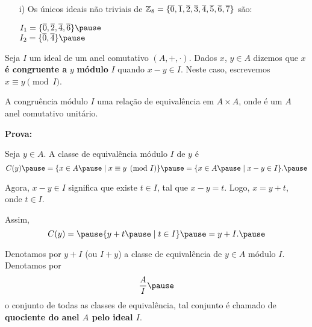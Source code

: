 \documentclass{beamer}
\begin{document}
    \begin{frame}
        \begin{exemplos}
            \begin{enumerate}
                \item[i)] Os {\'u}nicos ideais n{\~a}o triviais de \pause $\mathbb{Z}_8 = \{\overline{0}, \overline{1}, \overline{2}, \overline{3}, \overline{4}, \overline{5}, \overline{6}, \overline{7}\}$ s{\~a}o:\pause
                \begin{center}
                    $I_1 = \{\overline{0}, \overline{2}, \overline{4}, \overline{6}\}\pause$\\
                    $I_2 =\{\overline{0}, \overline{4}\}\pause$
                \end{center}
            \end{enumerate}
        \end{exemplos}
    \end{frame}

    \begin{frame}
        \begin{definicao}
            Seja $I$ um ideal \pause de um anel comutativo $(A, +, \cdot)$. \pause Dados $x$, $y \in A$ \pause dizemos que $x$ \textbf{\'e congruente a} $y$ \pause \textbf{m\'odulo} $I$ \pause quando $x - y \in I$. \pause Neste caso, escrevemos $x\equiv y \pmod I$.\pause
        \end{definicao}

        \begin{proposicao}
            A congru{\^e}ncia m{\'o}dulo $I$  uma rela{\c c}{\~a}o de equival{\^e}ncia em $A \times A$, \pause onde \'e um $A$ anel comutativo unit{\'a}rio.\pause
        \end{proposicao}
        \noindent \textbf{Prova:}

        \vspace{3cm}
    \end{frame}

    \begin{frame}
        Seja $y \in A$. \pause A classe de equival{\^e}ncia m{\'o}dulo $I$ \pause de $y$ {\'e}\pause 
        \[
            C(y) \pause = \{x \in A \pause \mid x\equiv y \pmod I\} \pause = \{x \in A \pause \mid x - y \in I\}.\pause
        \]

        Agora, $x - y \in I$ \pause significa que existe $t \in I$, \pause tal que $x - y = t$. \pause Logo, $x = y + t$, \pause onde $t \in I$.\pause

        Assim,\pause
        \[
            C(y) = \pause \{y + t\pause \mid t \in I\} \pause = y + I.\pause
        \]

        \begin{observacao}
            Denotamos por $y + I$ \pause (ou $I + y$) \pause a classe de equival{\^e}ncia de $y \in A$ \pause m{\'o}dulo $I$. \pause Denotamos por \pause 
            \[
                \dfrac{A}{I}\pause 
            \]
            o conjunto de todas as classes de equival{\^e}ncia, \pause tal conjunto {\'e} chamado de \textbf{quociente do anel $A$ pelo ideal $I$}.\pause
        \end{observacao}
    \end{frame}
\end{document}
